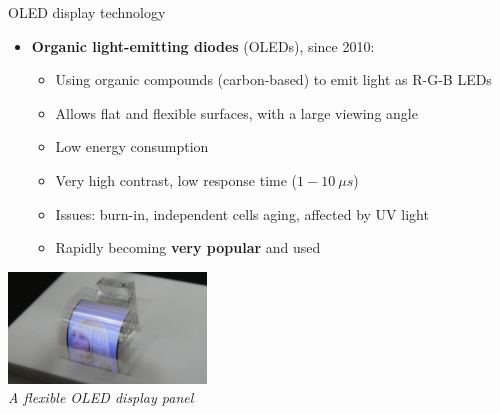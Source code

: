 \begin{frame}{OLED display technology}
  \begin{itemize}
  \item \textbf{Organic light-emitting diodes} (OLEDs), since 2010:
    \begin{itemize}
    \item Using organic compounds (carbon-based) to emit light as R-G-B LEDs
    \item Allows flat and flexible surfaces, with a large viewing angle
    \item Low energy consumption
    \item Very high contrast, low response time (\(1-10~\mu s\))
    \item Issues: burn-in, independent cells aging, affected by UV light
    \item Rapidly becoming \textbf{very popular} and used
    \end{itemize}
  \end{itemize}

  \begin{center}
  \includegraphics[height=8em]{slides/graphics-hardware/oled-display.jpg}\\
  \textit{\small A flexible OLED display panel}
  \end{center}
\end{frame}


